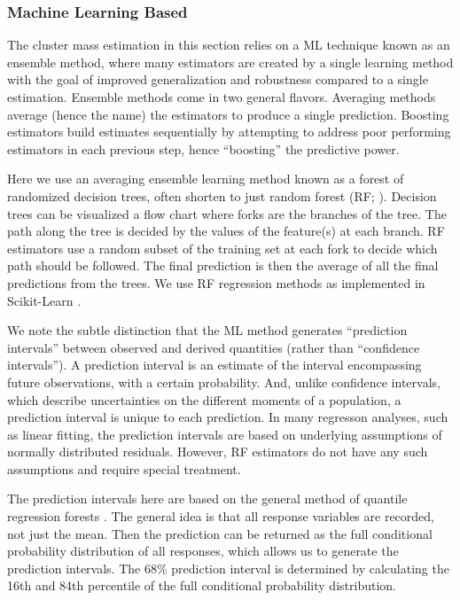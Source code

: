 \documentclass[fleqn,usenatbib]{mnras}
\begin{document}
\subsubsection{Machine Learning Based}\label{sec:machine learning method}
The cluster mass estimation in this section relies on a ML technique known as an ensemble method, where many estimators are created by a single learning method with the goal of improved generalization and robustness compared to a single estimation. Ensemble methods  come in two general flavors. Averaging methods average (hence the name) the estimators to produce a single prediction. Boosting estimators build estimates sequentially by attempting to address poor performing estimators in each previous step, hence ``boosting'' the predictive power.

Here we use an averaging ensemble learning method known as a forest of randomized decision trees, often shorten to just random forest (RF; \citealt{Ho1995, Ho1998}). Decision trees can be visualized a flow chart where forks are the branches of the tree. The path along the tree is decided by the values of the feature(s) at each branch. RF estimators use a random subset of the training set at each fork to decide which path should be followed. The final prediction is then the average of all the final predictions from the trees. We use RF regression methods as implemented in {\sc Scikit-Learn} \citep{Pedregosa2012}.

We note the subtle distinction that the ML method generates ``prediction intervals'' between observed and derived quantities (rather than ``confidence intervals''). A prediction interval is an estimate of the interval encompassing future observations, with a certain probability. And, unlike confidence intervals, which describe uncertainties on the different moments of a population, a prediction interval is unique to each prediction. In many regresson analyses, such as linear fitting, the prediction intervals are based on underlying assumptions of normally distributed residuals. However, RF estimators do not have any such assumptions and require special treatment.

The prediction intervals here are based on the general method of quantile regression forests \citep{Meinshausen2006}. The general idea is that all response variables are recorded, not just the mean. Then the prediction can be returned as the full conditional probability distribution of all responses, which allows us to generate the prediction intervals. The 68\% prediction interval is determined by calculating the 16th and 84th percentile of the full conditional probability distribution.
\end{document}
